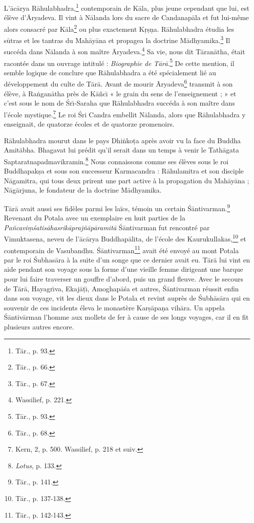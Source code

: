\documentclass[a4paper, 11pt, oneside, french]{article}
\begin{document}
L'\={a}c\={a}rya R\={a}hulabhadra,\footnote{T\={a}r., p. 93.} contemporain de K\={a}la, plus jeune cependant que lui, est élève d'\={A}ryadeva. Il vint à N\={a}landa lors du sacre de Candanap\={a}la et fut lui-même alors consacré par K\={a}la\footnote{T\={a}r., p. 66.} ou plus exactement K\d{r}\d{s}\d{n}a. R\={a}hulabhadra étudia les s\={u}tras et les tantras du Mah\={a}y\={a}na et propagea la doctrine M\={a}dhyamika.\footnote{T\={a}r., p. 67.} Il succéda dans N\={a}landa à son maître \={A}ryadeva.\footnote{Wassilief, p. 221.} Sa vie, nous dit T\={a}ran\={a}tha, était racontée dans un ouvrage intitulé : \emph{Biographie de T\={a}r\={a}}.\footnote{T\={a}r., p. 93.} De cette mention, il semble logique de conclure que R\={a}hulabhadra a été spécialement lié au développement du culte de T\={a}r\={a}. Avant de mourir \={A}ryadeva\footnote{T\={a}r., p. 68.} transmit à son élève, à Ra\.{n}gan\={a}tha près de K\={a}\~{n}c\={\i} « le grain du sens de l'enseignement ; » et c'est sous le nom de \'{S}r\={\i}-Saraha que R\={a}hulabhadra succéda à son maître dans l'école mystique.\footnote{Kern, 2, p. 500. Wassilief, p. 218 et suiv.} Le roi \'{S}ri Candra embellit N\={a}landa, alors que R\={a}hulabhadra y enseignait, de quatorze écoles et de quatorze promenoirs.

R\={a}hulabhadra mourut dans le pays Dhi\.{n}ko\d{t}a après avoir vu la face du Buddha Amit\={a}bha. Bhagavat lui prédit qu'il serait dans un temps à venir le Tath\={a}gata Saptaratnapadmavikramin.\footnote{\emph{Lotus}, p. 133.} Nous connaissons comme ses élèves sous le roi Buddhapak\d{s}a et sous son successeur Karmacandra : R\={a}hulamitra et son disciple N\={a}gamitra, qui tous deux prirent une part active à la propagation du Mah\={a}y\={a}na ; N\={a}g\={a}rjuna, le fondateur de la doctrine M\={a}dhyamika.

T\={a}r\={a} avait aussi ses fidèles parmi les laïcs, témoin un certain \'{S}\={a}ntivarman.\footnote{T\={a}r., p. 141.} Revenant du Potala avec un exemplaire en huit parties de la \emph{Pa\~{n}cavi\d{m}\'{s}atis\={a}hasrik\={a}praj\~{n}\={a}p\={a}ramit\={a}} \'{S}\={a}ntivarman fut rencontré par Vimuktasena, neveu de l'\={a}c\={a}rya Buddhap\={a}lita, de l'école des Kaurukullakas,\footnote{T\={a}r., p. 137-138.} et contemporain de Vasubandhu. \'{S}\={a}ntivarman\footnote{T\={a}r., p. 142-143.} avait été envoyé au mont Potala par le roi \'{S}ubhas\={a}ra à la suite d'un songe que ce dernier avait eu. T\={a}r\={a} lui vint en aide pendant son voyage sous la forme d'une vieille femme dirigeant une barque pour lui faire traverser un gouffre d'abord, puis un grand fleuve. Avec le secours de T\={a}r\={a}, Hayagr\={\i}va, Ekaj\={a}\d{t}\={\i}, Amoghap\={a}\'{s}a et autres, \'{S}\={a}ntivarman réussit enfin dans son voyage, vit les dieux dans le Potala et revint auprès de \'{S}ubh\={a}s\={a}ra qui en souvenir de ces incidents éleva le monastère Kar\d{s}\={a}pa\d{n}a vih\={a}ra. Un appela \'{S}\={a}ntiv\={a}rman l'homme aux mollets de fer à cause de ses longs voyages, car il en fit plusieurs autres encore.
\end{document}
